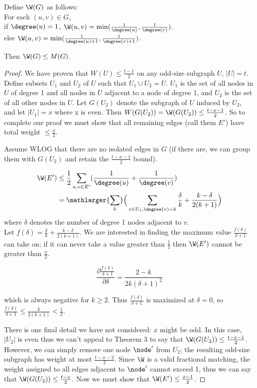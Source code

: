 \begin{lemma}
Define $\W(G)$ as follows:\\
For each $(u,v) \in G$,\\
if $\degree(u) = 1$, $\W(u,v) =  \min(\frac{1}{\degree(u)},\frac{1}{\degree(v)})$.\\
else $\W(u,v) =  \min(\frac{1}{\degree(u)+1},\frac{1}{\degree(v)+1})$.

Then $\W(G) \leq M(G)$.
\end{lemma}
\begin{proof}
We have proven that $W(U)\leq \frac{t-1}{2}$ on any odd-size subgraph $U$, $|U| = t$.  Define subsets $U_1$ and $U_2$ of $U$ such that $U_1 \cup U_2 = U$.  $U_1$ is the set of all nodes in $U$ of degree 1 and all nodes in $U$ adjacent to a node of degree 1, and $U_2$ is the set of all other nodes in $U$.  Let $G(U_2)$ denote the subgraph of $U$ induced by $U_2$, and let $|U_1| = x$ where x is even.  Then $W(G(U_2)) = \W(G(U_2)) \leq \frac{t-x-1}{2}$.  So to complete our proof we must show that all remaining edges (call them $E'$) have total weight $\leq \frac{x}{2}$.

Assume WLOG that there are no isolated edges in $G$ (if there are, we can group them with $G(U_2)$ and retain the $\frac{t-x-1}{2}$ bound).

\begin{align*}
\W(E') & \leq \frac{1}{2} \sum_{u,v \in E'} (\frac{1}{\degree(u)}+\frac{1}{\degree(v)})\\
& = \mathlarger{\sum_k} \Big(\sum_{v \in U_1, \degree(v) = k} \frac{\delta}{k} + \frac{k-\delta}{2(k+1)}\Big)
\end{align*}
where $\delta$ denotes the number of degree 1 nodes adjacent to $v$.\\
Let $f(\delta) = \frac{\delta}{k} + \frac{k-\delta}{2(k+1)}$.  We are interested in finding the maximum value $\frac{f(\delta)}{\delta+1}$ can take on; if it can never take a value greater than $\frac{1}{2}$ then $\W(E')$ cannot be greater than $\frac{x}{2}$.

$$\frac{\partial\frac{f(\delta)}{\delta+1}}{\partial \delta} = \frac{2-k}{2k(\delta+1)^2}$$

which is always negative for $k \geq 2$.  Thus $\frac{f(\delta)}{\delta+1}$ is maximized at $\delta = 0$, so  $\frac{f(\delta)}{\delta+1} \leq \frac{k}{2(k+1)} < \frac{1}{2}.$

There is one final detail we have not considered: $x$ might be odd.  In this case, $|U_2|$ is even thus we can't appeal to Theorem 3 to say that $\W(G(U_2)) \leq \frac{t-x-1}{2}$.  However, we can simply remove one node $\node'$ from $U_2$; the resulting odd-size subgraph has weight at most $\frac{t-x-2}{2}$.  Since $\W$ is a valid fractional matching, the weight assigned to all edges adjacent to $\node'$ cannot exceed 1, thus we can say that $\W(G(U_2)) \leq \frac{t-x}{2}$.  Now we must show that $\W(E') \leq \frac{x-1}{2}$.


\end{proof}
